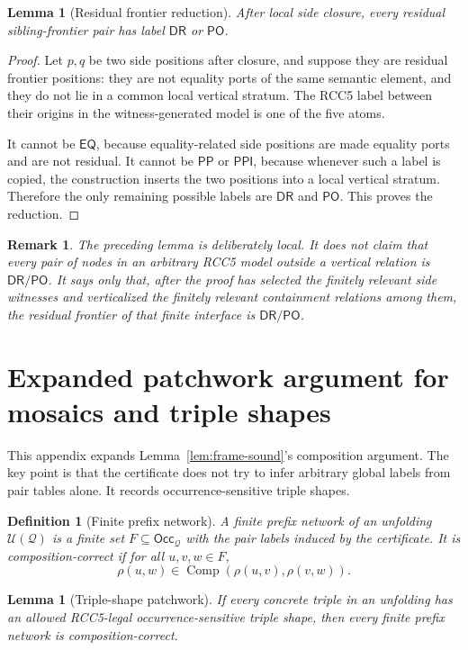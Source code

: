 \documentclass[11pt]{article}
\newtheorem{lemma}[theorem]{Lemma}
\newtheorem{definition}[theorem]{Definition}
\newtheorem{remark}[theorem]{Remark}
\newcommand{\EQ}{\mathsf{EQ}}
\newcommand{\DR}{\mathsf{DR}}
\newcommand{\PO}{\mathsf{PO}}
\newcommand{\PP}{\mathsf{PP}}
\newcommand{\PPI}{\mathsf{PPI}}
\newcommand{\comp}{\operatorname{Comp}}
\newcommand{\Q}{\mathcal Q}
\newcommand{\U}{\mathcal U}
\newcommand{\Occ}{\mathsf{Occ}}
\begin{document}
\begin{lemma}[Residual frontier reduction]
After local side closure, every residual sibling-frontier pair has label $\DR$ or $\PO$.
\end{lemma}

\begin{proof}
Let $p,q$ be two side positions after closure, and suppose they are residual frontier positions: they are not equality ports of the same semantic element, and they do not lie in a common local vertical stratum.  The RCC5 label between their origins in the witness-generated model is one of the five atoms.

It cannot be $\EQ$, because equality-related side positions are made equality ports and are not residual.  It cannot be $\PP$ or $\PPI$, because whenever such a label is copied, the construction inserts the two positions into a local vertical stratum.  Therefore the only remaining possible labels are $\DR$ and $\PO$.  This proves the reduction.
\end{proof}

\begin{remark}
The preceding lemma is deliberately local.  It does not claim that every pair of nodes in an arbitrary RCC5 model outside a vertical relation is $\DR/\PO$.  It says only that, after the proof has selected the finitely relevant side witnesses and verticalized the finitely relevant containment relations among them, the residual frontier of that finite interface is $\DR/\PO$.
\end{remark}

\section{Expanded patchwork argument for mosaics and triple shapes}

This appendix expands Lemma~\ref{lem:frame-sound}'s composition argument.  The key point is that the certificate does not try to infer arbitrary global labels from pair tables alone.  It records occurrence-sensitive triple shapes.

\begin{definition}[Finite prefix network]
A finite prefix network of an unfolding $\U(\Q)$ is a finite set $F\subseteq\Occ_\Q$ with the pair labels induced by the certificate.  It is composition-correct if for all $u,v,w\in F$,
\[
  \rho(u,w)\in\comp(\rho(u,v),\rho(v,w)).
\]
\end{definition}

\begin{lemma}[Triple-shape patchwork]
If every concrete triple in an unfolding has an allowed RCC5-legal occurrence-sensitive triple shape, then every finite prefix network is composition-correct.
\end{lemma}
\end{document}
